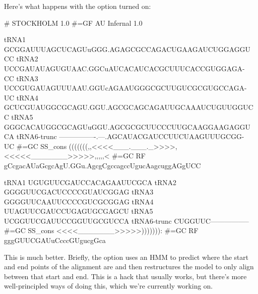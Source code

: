 Here's what happens with the  option turned on:

\begin{sreoutput}
# STOCKHOLM 1.0
#=GF AU Infernal 1.0

tRNA1        GCGGAUUUAGCUCAGUuGGG.AGAGCGCCAGACUGAAGAUCUGGAGGUCC
tRNA2        UCCGAUAUAGUGUAAC.GGCuAUCACAUCACGCUUUCACCGUGGAGA-CC
tRNA3        UCCGUGAUAGUUUAAU.GGUcAGAAUGGGCGCUUGUCGCGUGCCAGA-UC
tRNA4        GCUCGUAUGGCGCAGU.GGU.AGCGCAGCAGAUUGCAAAUCUGUUGGUCC
tRNA5        GGGCACAUGGCGCAGUuGGU.AGCGCGCUUCCCUUGCAAGGAAGAGGUCA
tRNA6-trunc  ----------------.---.AGCAUACGAUCCUUCUAAGUUUGCGG-UC
#=GC SS_cons (((((((,,<<<<___.___._>>>>,<<<<<_______>>>>>,,,,,<
#=GC RF      gCcgacAUaGcgcAgU.GGu.AgcgCgccagccUgucAagcuggAGgUCC

tRNA1        UGUGUUCGAUCCACAGAAUUCGCA
tRNA2        GGGGUUCGACUCCCCGUAUCGGAG
tRNA3        GGGGUUCAAUUCCCCGUCGCGGAG
tRNA4        UUAGUUCGAUCCUGAGUGCGAGCU
tRNA5        UCGGUUCGAUUCCGGUUGCGUCCA
tRNA6-trunc  CUGGUUC-----------------
#=GC SS_cons <<<<_______>>>>>))))))):
#=GC RF      gggGUUCGAUuCcccGUgucgGca

\end{sreoutput}

This is much better. Briefly, the  option uses an HMM to
predict where the start and end points of the alignment are and then
restructures the model to only align between that start and end. This
is a hack that usually works, but there's more well-principled ways of
doing this, which we're currently working on.

